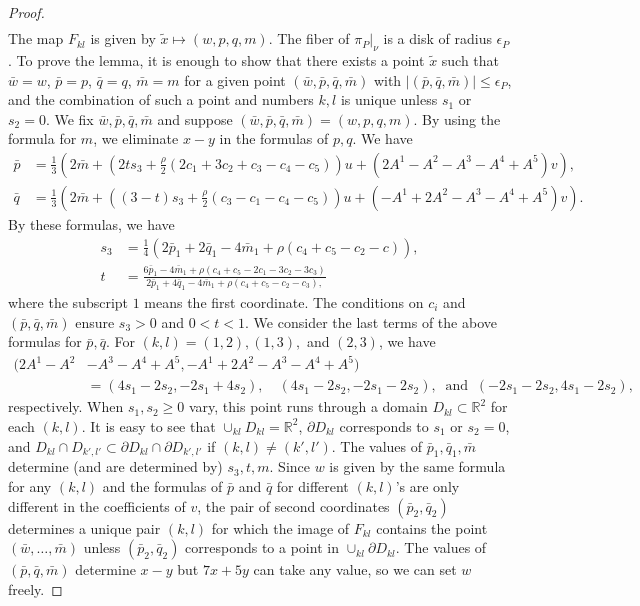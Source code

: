 \documentclass[reqno]{amsart}
\theoremstyle{definition}
\theoremstyle{plain}
\newcommand{\RR}{\mathbb{R}}
\begin{document}
\begin{proof}
\[\begin{split}
\end{split}
\] The map $F_{kl}$ is given by $\tilde x\mapsto (w,p,q,m)$. The fiber of $\pi_P|_\nu$ is a disk of radius $\epsilon_P$. To prove the lemma, it is enough to show that there exists a point $\tilde x$ such that $\bar w=w$, $\bar p=p$, $ \bar q=q$, $\bar m=m$  for a given point $(\bar w,\bar p,\bar q,\bar m)$ with $|(\bar p,\bar q,\bar m)|\leq \epsilon_P$, and the combination of such a point and numbers $k,l$ is unique unless $s_1$ or $s_2=0$. We fix $\bar w, \bar p, \bar q,\bar m$ and suppose $(\bar w, \bar p,\bar q,\bar m)=(w, p,q,m)$.  By using the formula for $m$, we eliminate $x-y$ in the formulas of $p,q$. We have
\[
\begin{split}
\bar p&=\frac{1}{3}(2\bar m+(2ts_3+\frac{\rho}{2}(2c_1+3c_2+c_3-c_4-c_5))u+(2A^1-A^2-A^3-A^4+A^5)v),\\
\bar q&=\frac{1}{3}(2\bar m+((3-t)s_3+\frac{\rho}{2}(c_3-c_1-c_4-c_5))u+(-A^1+2A^2-A^3-A^4+A^5)v).
\end{split}
\]
By these formulas, we have
\[
\begin{split}
s_3&=\frac{1}{4}(2\bar p_1+2\bar q_1-4\bar m_1+\rho(c_4+c_5-c_2-c)),\\
t&=\frac{6\bar p_1-4\bar m_1+\rho(c_4+c_5-2c_1-3c_2-3c_3)}{2\bar p_1+4\bar q_1-4\bar m_1+\rho (c_4+c_5-c_2-c_3),}
\end{split}
\]
where the subscript $1$ means the first coordinate. The conditions on $c_i$ and $(\bar p,\bar q,\bar m)$ ensure $s_3>0$ and $0<t<1$. We consider the  last terms of the above formulas for $\bar p,\bar q$. For $(k,l)=(1,2), (1,3),$ and $(2,3)$, we have
\[
\begin{split}
(2A^1-A^2&-A^3-A^4+A^5, -A^1+2A^2-A^3-A^4+A^5)\\
&=(4s_1-2s_2,-2s_1+4s_2), \quad 
 (4s_1-2s_2,-2s_1-2s_2), \ \text{ and }\ (-2s_1-2s_2, 4s_1-2s_2),
\end{split}
\]
respectively. When $s_1, s_2\geq 0$ vary, this point runs through a domain $D_{kl}\subset \RR^2$ for each $(k,l)$. It is easy to see that $\cup_{kl}D_{kl}=\RR^2$, $\partial D_{kl}$ corresponds to $s_1$ or $s_2=0$, and $D_{kl}\cap D_{k',l'}\subset \partial D_{kl} \cap \partial D_{k',l'} $ if $(k,l)\not=(k',l')$. The values of $\bar p_1, \bar q_1, \bar m$ determine (and are determined by)  $s_3, t, m$. Since $w$ is given by the same formula for any $(k,l)$ and the formulas of  $\bar p$ and $\bar q$ for different $(k,l)$'s are only different in the coefficients of $v$,  the pair of second coordinates $(\bar p_2,\bar q_2)$ determines a unique pair $(k,l)$ for which the image of $F_{kl}$ contains the point $(\bar w,\dots, \bar m)$ unless $(\bar p_2,\bar q_2)$ corresponds to a point in  $\cup_{kl}\partial D_{kl}$. The values of $(\bar p,\bar q,\bar m)$ determine $x-y$  but $7x+5y$ can take any value, so we can set $w$ freely. %
\end{proof}
\end{document}
